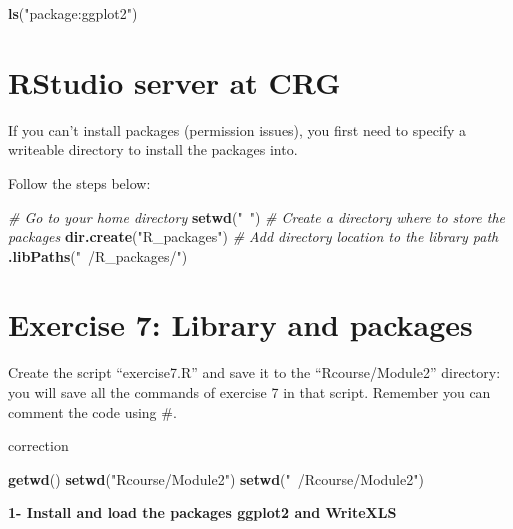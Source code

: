 \documentclass[]{book}
\newenvironment{Shaded}{\begin{snugshade}}{\end{snugshade}}
\newcommand{\CommentTok}[1]{\textcolor[rgb]{0.56,0.35,0.01}{\textit{#1}}}
\newcommand{\KeywordTok}[1]{\textcolor[rgb]{0.13,0.29,0.53}{\textbf{#1}}}
\newcommand{\NormalTok}[1]{#1}
\newcommand{\StringTok}[1]{\textcolor[rgb]{0.31,0.60,0.02}{#1}}
\begin{document}
\begin{Shaded}
\begin{Highlighting}[]
\KeywordTok{ls}\NormalTok{(}\StringTok{"package:ggplot2"}\NormalTok{)}
\end{Highlighting}
\end{Shaded}

\hypertarget{rstudio-server-at-crg}{%
\section{RStudio server at CRG}\label{rstudio-server-at-crg}}

If you can't install packages (permission issues), you first need to specify a writeable directory to install the packages into.

Follow the steps below:

\begin{Shaded}
\begin{Highlighting}[]
\CommentTok{# Go to your home directory}
\KeywordTok{setwd}\NormalTok{(}\StringTok{"~"}\NormalTok{)}
\CommentTok{# Create a directory where to store the packages}
\KeywordTok{dir.create}\NormalTok{(}\StringTok{"R_packages"}\NormalTok{)}
\CommentTok{# Add directory location to the library path}
\KeywordTok{.libPaths}\NormalTok{(}\StringTok{"~/R_packages/"}\NormalTok{)}
\end{Highlighting}
\end{Shaded}

\hypertarget{exercise-7-library-and-packages}{%
\section{Exercise 7: Library and packages}\label{exercise-7-library-and-packages}}

Create the script ``exercise7.R'' and save it to the ``Rcourse/Module2'' directory: you will save all the commands of exercise 7 in that script.
Remember you can comment the code using \#.

correction

\begin{Shaded}
\begin{Highlighting}[]
\KeywordTok{getwd}\NormalTok{()}
\KeywordTok{setwd}\NormalTok{(}\StringTok{"Rcourse/Module2"}\NormalTok{)}
\KeywordTok{setwd}\NormalTok{(}\StringTok{"~/Rcourse/Module2"}\NormalTok{)}
\end{Highlighting}
\end{Shaded}

\textbf{1- Install and load the packages ggplot2 and WriteXLS}
\end{document}
